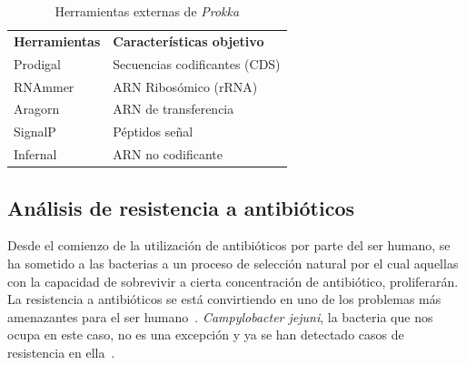 \begin{table}[!htb]

\begin{center}
\begin{tabularx}{\textwidth}{bb}
\arrayrulecolor{NavyBlue}\hline
\textbf{\textcolor{NavyBlue}{Herramientas}} &
\textbf{\textcolor{NavyBlue}{Características objetivo}}\\
\quad Prodigal~\cite{Hyatt2010} &
\begin{minipage}[t]{\linewidth}
\quad Secuencias codificantes (CDS)
\end{minipage}\\

\quad RNAmmer~\cite{Lagesen2007} &
\begin{minipage}[t]{\linewidth}
\quad ARN Ribosómico (rRNA)
\end{minipage}\\

\quad Aragorn~\cite{Laslett2004} &
\begin{minipage}[t]{\linewidth}
\quad ARN de transferencia
\end{minipage}\\

\quad SignalP~\cite{Petersen2011} &
\begin{minipage}[t]{\linewidth}
\quad Péptidos señal
\end{minipage}\\

\quad Infernal~\cite{Kolbe2011} &
\begin{minipage}[t]{\linewidth}
\quad ARN no codificante
\end{minipage}\\
\hline
\end{tabularx}
\end{center}
\caption{Herramientas externas de \textit{Prokka}}
\label{table:ProkkaTools}
\end{table}

\subsection{Análisis de resistencia a antibióticos}
Desde el comienzo de la utilización de antibióticos por parte del ser humano, se ha sometido a las bacterias a un proceso de selección natural por el cual aquellas con la capacidad de sobrevivir a cierta concentración de antibiótico, proliferarán. La resistencia a antibióticos se está convirtiendo en uno de los problemas más amenazantes para el ser humano~\cite{Neu1064}. \textit{Campylobacter jejuni}, la bacteria que nos ocupa en este caso, no es una excepción y ya se han detectado casos de resistencia en ella~\cite{Smith1999}. 


